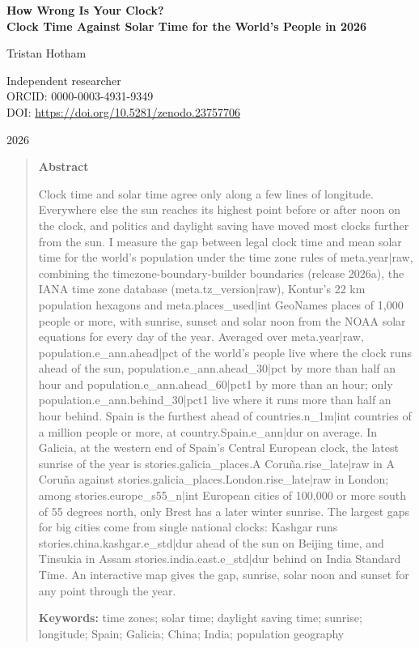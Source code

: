 \documentclass[11pt,a4paper]{article}
\begin{document}
\begin{center}
{\Large\bfseries How Wrong Is Your Clock?\\[2pt] Clock Time Against Solar Time for the World's People in 2026\par}
\vspace{1.2em}
{\large Tristan Hotham\par}
\vspace{0.3em}
{\small Independent researcher\\
ORCID: 0000-0003-4931-9349\\
DOI: \href{https://doi.org/10.5281/zenodo.23757706}{https://doi.org/10.5281/zenodo.23757706}\par}
\vspace{0.8em}
2026
\end{center}

\begin{quote}
\small
\begin{center}\textbf{Abstract}\end{center}
Clock time and solar time agree only along a few lines of longitude. Everywhere else the sun reaches its highest point before or after noon on the clock, and politics and daylight saving have moved most clocks further from the sun. I measure the gap between legal clock time and mean solar time for the world's population under the time zone rules of {{meta.year|raw}}, combining the timezone-boundary-builder boundaries (release 2026a), the IANA time zone database ({{meta.tz_version|raw}}), Kontur's 22 km population hexagons and {{meta.places_used|int}} GeoNames places of 1,000 people or more, with sunrise, sunset and solar noon from the NOAA solar equations for every day of the year. Averaged over {{meta.year|raw}}, {{population.e_ann.ahead|pct}} of the world's people live where the clock runs ahead of the sun, {{population.e_ann.ahead_30|pct}} by more than half an hour and {{population.e_ann.ahead_60|pct1}} by more than an hour; only {{population.e_ann.behind_30|pct1}} live where it runs more than half an hour behind. Spain is the furthest ahead of {{countries.n_1m|int}} countries of a million people or more, at {{country.Spain.e_ann|dur}} on average. In Galicia, at the western end of Spain's Central European clock, the latest sunrise of the year is {{stories.galicia_places.A Coruña.rise_late|raw}} in A Coruña against {{stories.galicia_places.London.rise_late|raw}} in London; among {{stories.europe_s55_n|int}} European cities of 100,000 or more south of 55 degrees north, only Brest has a later winter sunrise. The largest gaps for big cities come from single national clocks: Kashgar runs {{stories.china.kashgar.e_std|dur}} ahead of the sun on Beijing time, and Tinsukia in Assam {{stories.india.east.e_std|dur}} behind on India Standard Time. An interactive map gives the gap, sunrise, solar noon and sunset for any point through the year.

\textbf{Keywords:} time zones; solar time; daylight saving time; sunrise; longitude; Spain; Galicia; China; India; population geography
\end{quote}
\end{document}
